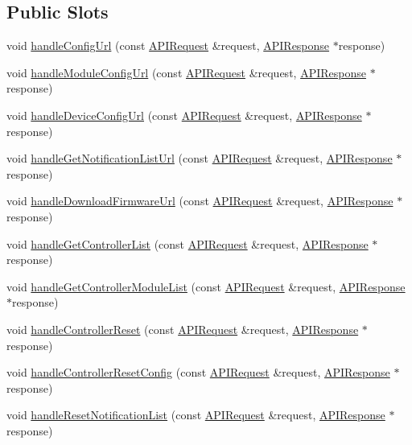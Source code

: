 \subsection*{Public Slots}
\begin{DoxyCompactItemize}
\item 
void \hyperlink{class_a_p_i_controller_ac1fe4dd7b8df2e4cceb554e46bea894d}{handle\+Config\+Url} (const \hyperlink{class_a_p_i_request}{A\+P\+I\+Request} \&request, \hyperlink{class_a_p_i_response}{A\+P\+I\+Response} $\ast$response)
\item 
void \hyperlink{class_a_p_i_controller_a6274380cb71807d07d813b7e67e0c0c2}{handle\+Module\+Config\+Url} (const \hyperlink{class_a_p_i_request}{A\+P\+I\+Request} \&request, \hyperlink{class_a_p_i_response}{A\+P\+I\+Response} $\ast$response)
\item 
void \hyperlink{class_a_p_i_controller_a3d32a4cf1f6a06697b09d43a2be140cf}{handle\+Device\+Config\+Url} (const \hyperlink{class_a_p_i_request}{A\+P\+I\+Request} \&request, \hyperlink{class_a_p_i_response}{A\+P\+I\+Response} $\ast$response)
\item 
void \hyperlink{class_a_p_i_controller_a3217b84dcc811d83e4c7241a5e19c35c}{handle\+Get\+Notification\+List\+Url} (const \hyperlink{class_a_p_i_request}{A\+P\+I\+Request} \&request, \hyperlink{class_a_p_i_response}{A\+P\+I\+Response} $\ast$response)
\item 
void \hyperlink{class_a_p_i_controller_afb480d438e18a2551229810280a65806}{handle\+Download\+Firmware\+Url} (const \hyperlink{class_a_p_i_request}{A\+P\+I\+Request} \&request, \hyperlink{class_a_p_i_response}{A\+P\+I\+Response} $\ast$response)
\item 
void \hyperlink{class_a_p_i_controller_ad37a3ecaf99e3b7c43ecb4ec4873fea9}{handle\+Get\+Controller\+List} (const \hyperlink{class_a_p_i_request}{A\+P\+I\+Request} \&request, \hyperlink{class_a_p_i_response}{A\+P\+I\+Response} $\ast$response)
\item 
void \hyperlink{class_a_p_i_controller_a20ce823aeb786d2af26fde41c2dc74a1}{handle\+Get\+Controller\+Module\+List} (const \hyperlink{class_a_p_i_request}{A\+P\+I\+Request} \&request, \hyperlink{class_a_p_i_response}{A\+P\+I\+Response} $\ast$response)
\item 
void \hyperlink{class_a_p_i_controller_a0e01eab749423dcfff0b595abf4175ad}{handle\+Controller\+Reset} (const \hyperlink{class_a_p_i_request}{A\+P\+I\+Request} \&request, \hyperlink{class_a_p_i_response}{A\+P\+I\+Response} $\ast$response)
\item 
void \hyperlink{class_a_p_i_controller_a0d4deeaff703bb7d60eb344e6ee9f8cb}{handle\+Controller\+Reset\+Config} (const \hyperlink{class_a_p_i_request}{A\+P\+I\+Request} \&request, \hyperlink{class_a_p_i_response}{A\+P\+I\+Response} $\ast$response)
\item 
void \hyperlink{class_a_p_i_controller_a9b2f08f4b0a67c0a4f6891a9d8601b93}{handle\+Reset\+Notification\+List} (const \hyperlink{class_a_p_i_request}{A\+P\+I\+Request} \&request, \hyperlink{class_a_p_i_response}{A\+P\+I\+Response} $\ast$response)
\end{DoxyCompactItemize}
